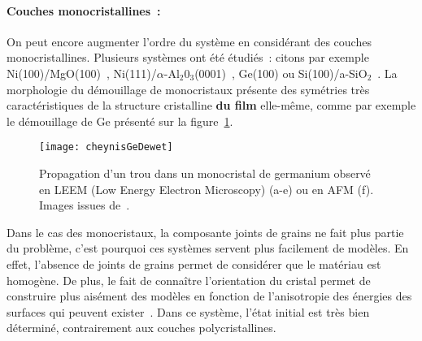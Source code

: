 \paragraph*{Couches monocristallines~:} On peut encore augmenter l'ordre du système en considérant des couches monocristallines. Plusieurs systèmes ont été étudiés~: citons par exemple Ni(100)/MgO(100)~\cite{zucker2016mechanism}, Ni(111)/$\alpha$-Al$_2$0$_3$(0001)~\cite{rabkin2014solid}, Ge(100) ou Si(100)/a-SiO$_2$~\cite{leroy2013influence, cheynis2013dynamics}. La morphologie du démouillage de monocristaux présente des symétries très caractéristiques de la structure cristalline \textbf{du film} elle-même, comme par exemple le démouillage de Ge présenté sur la figure~\ref{cheynisGeDewet}.\par
\begin{figure}[!htb]
\centering
\texttt{[image: cheynisGeDewet]}
\caption{Propagation d'un trou dans un monocristal de germanium observé en LEEM (Low Energy Electron Microscopy) (a-e) ou en AFM (f). Images issues de~\cite{cheynis2013dynamics}.}
\label{cheynisGeDewet}
\end{figure}
Dans le cas des monocristaux, la composante \og joints de grains \fg{} ne fait plus partie du problème, c'est pourquoi ces systèmes servent plus facilement de modèles. En effet, l'absence de joints de grains permet de considérer que le matériau est homogène. De plus, le fait de connaître l'orientation du cristal permet de construire plus aisément des modèles en fonction de l'anisotropie des énergies des surfaces qui peuvent exister~\cite{zucker2013model}. Dans ce système, l'état initial est très bien déterminé, contrairement aux couches polycristallines.\par




